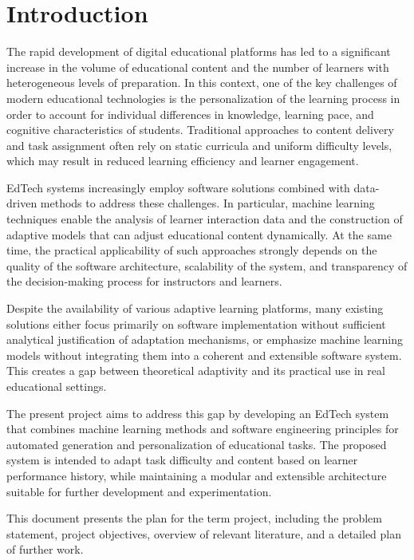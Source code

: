 \documentclass[a4paper,12pt]{extarticle}
\begin{document}
\section{Introduction}

The rapid development of digital educational platforms has led to a significant increase in the volume of educational content and the number of learners with heterogeneous levels of preparation. In this context, one of the key challenges of modern educational technologies is the personalization of the learning process in order to account for individual differences in knowledge, learning pace, and cognitive characteristics of students. Traditional approaches to content delivery and task assignment often rely on static curricula and uniform difficulty levels, which may result in reduced learning efficiency and learner engagement.

EdTech systems increasingly employ software solutions combined with data-driven methods to address these challenges. In particular, machine learning techniques enable the analysis of learner interaction data and the construction of adaptive models that can adjust educational content dynamically. At the same time, the practical applicability of such approaches strongly depends on the quality of the software architecture, scalability of the system, and transparency of the decision-making process for instructors and learners.

Despite the availability of various adaptive learning platforms, many existing solutions either focus primarily on software implementation without sufficient analytical justification of adaptation mechanisms, or emphasize machine learning models without integrating them into a coherent and extensible software system. This creates a gap between theoretical adaptivity and its practical use in real educational settings.

The present project aims to address this gap by developing an EdTech system that combines machine learning methods and software engineering principles for automated generation and personalization of educational tasks. The proposed system is intended to adapt task difficulty and content based on learner performance history, while maintaining a modular and extensible architecture suitable for further development and experimentation.

This document presents the plan for the term project, including the problem statement, project objectives, overview of relevant literature, and a detailed plan of further work.
\end{document}
